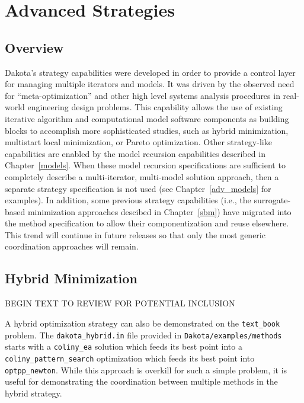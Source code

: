 \chapter{Advanced Strategies}\label{strat}

\section{Overview}\label{strat:overview}

Dakota's strategy capabilities were developed in order to provide a
control layer for managing multiple iterators and models. It was
driven by the observed need for ``meta-optimization'' and other high
level systems analysis procedures in real-world engineering design
problems. This capability allows the use of existing iterative
algorithm and computational model software components as building
blocks to accomplish more sophisticated studies, such as hybrid
minimization, multistart local minimization, or Pareto optimization.
Other strategy-like capabilities are enabled by the model recursion
capabilities described in Chapter~\ref{models}.  When these model
recursion specifications are sufficient to completely describe a
multi-iterator, multi-model solution approach, then a separate
strategy specification is not used (see Chapter~\ref{adv_models} for
examples).  In addition, some previous strategy capabilities (i.e.,
the surrogate-based minimization approaches descibed in
Chapter~\ref{sbm}) have migrated into the method specification to
allow their componentization and reuse elsewhere.  This trend will
continue in future releases so that only the most generic coordination
approaches will remain.

\section{Hybrid Minimization}\label{strat:hybrid}

BEGIN TEXT TO REVIEW FOR POTENTIAL INCLUSION

A hybrid optimization strategy can also be demonstrated on the
\texttt{text\_book} problem. The \texttt{dakota\_hybrid.in} file
provided in {\tt Dakota/examples/methods} starts with a
\texttt{coliny\_ea} solution which feeds its best point into a
\texttt{coliny\_pattern\_search} optimization which feeds its best
point into \texttt{optpp\_newton}. While this approach is overkill for
such a simple problem, it is useful for demonstrating the coordination
between multiple methods in the hybrid strategy.

